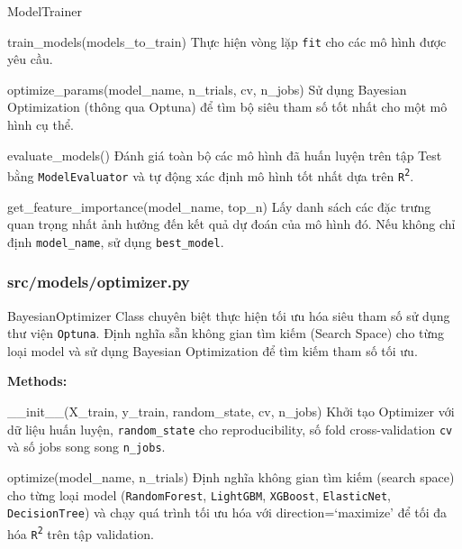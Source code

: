 \documentclass[12pt,a4paper]{article}
\newenvironment{methodlist}{
    \begin{description}[style=nextline, font=\ttfamily\color{sklearn-blue}]
}{
    \end{description}
}
\begin{document}
\begin{classbox}{ModelTrainer}
\begin{methodlist}
    \item[train\_models(models\_to\_train)] 
    Thực hiện vòng lặp \texttt{fit} cho các mô hình được yêu cầu.
    
    \item[optimize\_params(model\_name, n\_trials, cv, n\_jobs)] 
    Sử dụng Bayesian Optimization (thông qua Optuna) để tìm bộ siêu tham số tốt nhất cho một mô hình cụ thể.
    
    \item[evaluate\_models()] 
    Đánh giá toàn bộ các mô hình đã huấn luyện trên tập Test bằng \texttt{ModelEvaluator} và tự động xác định mô hình tốt nhất dựa trên \texttt{R\textsuperscript{2}}.
    
    \item[get\_feature\_importance(model\_name, top\_n)] 
    Lấy danh sách các đặc trưng quan trọng nhất ảnh hưởng đến kết quả dự đoán của mô hình đó. Nếu không chỉ định \texttt{model\_name}, sử dụng \texttt{best\_model}.
\end{methodlist}
\end{classbox}

\subsubsection{src/models/optimizer.py}

\begin{classbox}{BayesianOptimizer}
Class chuyên biệt thực hiện tối ưu hóa siêu tham số sử dụng thư viện \texttt{Optuna}.
Định nghĩa sẵn không gian tìm kiếm (Search Space) cho từng loại model và sử dụng Bayesian Optimization để tìm kiếm tham số tối ưu.

\vspace{0.2cm}
\textbf{Methods:}
\begin{methodlist}
    \item[\_\_init\_\_(X\_train, y\_train, random\_state, cv, n\_jobs)] 
    Khởi tạo Optimizer với dữ liệu huấn luyện, \texttt{random\_state} cho reproducibility, số fold cross-validation \texttt{cv} và số jobs song song \texttt{n\_jobs}.
    
    \item[optimize(model\_name, n\_trials)] 
    Định nghĩa không gian tìm kiếm (search space) cho từng loại model (\texttt{RandomForest}, \texttt{LightGBM}, \texttt{XGBoost}, \texttt{ElasticNet}, \texttt{DecisionTree}) và chạy quá trình tối ưu hóa với direction=`maximize' để tối đa hóa \texttt{R\textsuperscript{2}} trên tập validation.
\end{methodlist}
\end{classbox}
\end{document}
